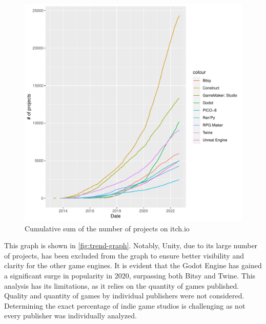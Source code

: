 \begin{figure}[ht!]
    \begin{center}
        \includegraphics[width=1.1\columnwidth]{figures/trend-graph.pdf}
        \caption{\label{fig:trend-graph} Cumulative sum of the number of projects on itch.io}
    \end{center}
\end{figure}

This graph is shown in \autoref{fig:trend-graph}.
Notably, Unity, due to its large number of projects, has been excluded from the graph to ensure better visibility and clarity for the other game engines.
It is evident that the Godot Engine has gained a significant surge in popularity in 2020, surpassing both Bitsy and Twine.
This analysis has its limitations, as it relies on the quantity of games published.
Quality and quantity of games by individual publishers were not considered.
Determining the exact percentage of indie game studios is challenging as not every publisher was individually analyzed.

